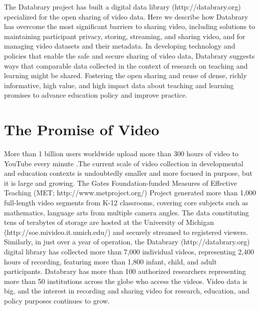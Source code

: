 \documentclass[letterpaper,man,apacite]{apa6}
\begin{document}
The Databrary project has built a digital data library (http://databrary.org) specialized for the open sharing of video data.
Here we describe how Databrary has overcome the most significant barriers to sharing video, including solutions to maintaining participant privacy, storing, streaming, and sharing video, and for managing video datasets and their metadata.
In developing technology and policies that enable the safe and secure sharing of video data, Databrary suggests ways that comparable data collected in the context of research on teaching and learning might be shared.
Fostering the open sharing and reuse of dense, richly informative, high value, and high impact data about teaching and learning promises to advance education policy and improve practice.

\section{The Promise of Video}

More than 1 billion users worldwide upload more than 300 hours of video to YouTube every minute \cite{YouTube2015}.The current scale of video collection in developmental and education contexts is undoubtedly smaller and more focused in purpose, but it is large and growing. 
The Gates Foundation-funded Measures of Effective Teaching (MET; http://www.metproject.org/) Project generated more than 1,000 full-length video segments from K-12 classrooms, covering core subjects such as mathematics, language arts from multiple camera angles. 
The data constituting tens of terabytes of storage are hosted at the University of Michigan (http://soe.mivideo.it.umich.edu/) and securely streamed to registered viewers.
Similarly, in just over a year of operation, the Databrary (http://databrary.org) digital library has collected more than 7,000 individual videos, representing 2,400 hours of recording, featuring more than 1,800 infant, child, and adult participants.
Databrary has more than 100 authorized researchers representing more than 50 institutions across the globe who access the videos.
Video data is big, and the interest in recording and sharing video for research, education, and policy purposes continues to grow.
\end{document}
